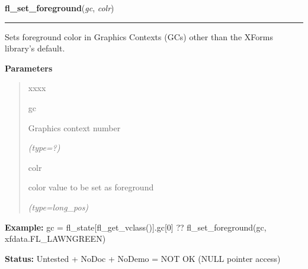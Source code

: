 \hspace{.8\funcindent}\begin{boxedminipage}{\funcwidth}

    \raggedright \textbf{fl\_set\_foreground}(\textit{gc}, \textit{colr})

    \vspace{-1.5ex}

    \rule{\textwidth}{0.5\fboxrule}
\setlength{\parskip}{2ex}
    Sets foreground color in Graphics Contexts (GCs) other than the XForms 
    library's default.

\setlength{\parskip}{1ex}
      \textbf{Parameters}
      \vspace{-1ex}

      \begin{quote}
        \begin{Ventry}{xxxx}

          \item[gc]

          Graphics context number

            {\it (type=?)}

          \item[colr]

          color value to be set as foreground

            {\it (type=long\_pos)}

        \end{Ventry}

      \end{quote}

\textbf{Example:} gc = fl\_state[fl\_get\_vclass()].gc[0] ?? fl\_set\_foreground(gc, 
xfdata.FL\_LAWNGREEN)



\textbf{Status:} Untested + NoDoc + NoDemo = NOT OK (NULL pointer access)



    \end{boxedminipage}

    \label{xformslib:flxbasic:fl_set_background}

    \vspace{0.5ex}

